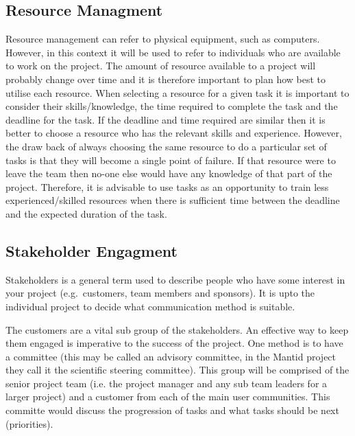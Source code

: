 \documentclass[jnr]{iosart2x}
\begin{document}
\subsection{Resource Managment}\label{rman}
Resource management can refer to physical equipment, such as computers.
However, in this context it will be used to refer to individuals who are available to work on the project.
The amount of resource available to a project will probably change over time and it is therefore important to plan how best to utilise each resource.
When selecting a resource for a given task it is important to consider their skills/knowledge, the time required to complete the task and the deadline for the task.
If the deadline and time required are similar then it is better to choose a resource who has the relevant skills and experience.
However, the draw back of always choosing the same resource to do a particular set of tasks is that they will become a single point of failure.
If that resource were to leave the team then no-one else would have any knowledge of that part of the project.
Therefore, it is advisable to use tasks as an opportunity to train less experienced/skilled resources when there is sufficient time between the deadline and the expected duration of the task.

\subsection{Stakeholder Engagment}\label{se}
Stakeholders is a general term used to describe people who have some interest in your project (e.g.\ customers, team members and sponsors).
It is upto the individual project to decide what communication method is suitable.

The customers are a vital sub group of the stakeholders.
An effective way to keep them engaged is imperative to the success of the project.
One method is to have a committee (this may be called an advisory committee, in the Mantid project they call it the scientific steering committee).
This group will be comprised of the senior project team (i.e. the project manager and any sub team leaders for a larger project) and a customer from each of the main user communities.
This committe would discuss the progression of tasks and what tasks should be next (priorities).
\end{document}
